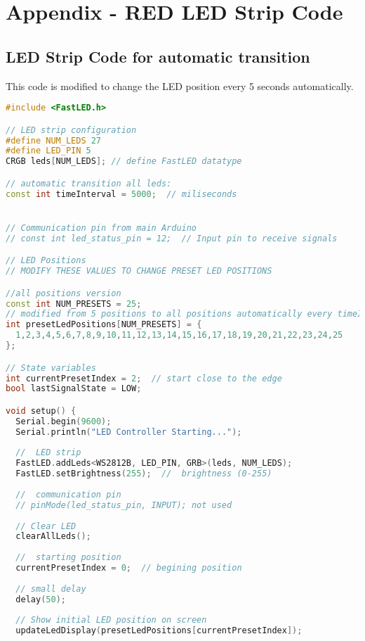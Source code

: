 
\section{Appendix - RED LED Strip Code}
\subsection{LED Strip Code for automatic transition}
\label{REDappendix}
This code is modified to change the LED position every 5 seconds automatically.


\begin{lstlisting}[style=cstyle, caption=Cpp Code of the RGB strip with automatic changes, label=lst:RGBcodeAutomatic, language=c++ ]
    #include <FastLED.h>

// LED strip configuration
#define NUM_LEDS 27
#define LED_PIN 5
CRGB leds[NUM_LEDS]; // define FastLED datatype

// automatic transition all leds:
const int timeInterval = 5000;  // miliseconds


// Communication pin from main Arduino
// const int led_status_pin = 12;  // Input pin to receive signals

// LED Positions 
// MODIFY THESE VALUES TO CHANGE PRESET LED POSITIONS

//all positions version
const int NUM_PRESETS = 25;
// modified from 5 positions to all positions automatically every timeInterval seconds
int presetLedPositions[NUM_PRESETS] = {
  1,2,3,4,5,6,7,8,9,10,11,12,13,14,15,16,17,18,19,20,21,22,23,24,25   
};

// State variables
int currentPresetIndex = 2;  // start close to the edge
bool lastSignalState = LOW;

void setup() {
  Serial.begin(9600);
  Serial.println("LED Controller Starting...");
 
  //  LED strip
  FastLED.addLeds<WS2812B, LED_PIN, GRB>(leds, NUM_LEDS);
  FastLED.setBrightness(255);  //  brightness (0-255)
 
  //  communication pin
  // pinMode(led_status_pin, INPUT); not used
 
  // Clear LED
  clearAllLeds();
  
  //  starting position
  currentPresetIndex = 0;  // begining position 
  
  // small delay
  delay(50);
 
  // Show initial LED position on screen
  updateLedDisplay(presetLedPositions[currentPresetIndex]);
  

\end{lstlisting}
